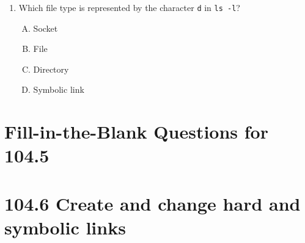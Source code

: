 \documentclass[a4paper]{report}
\begin{document}
\begin{enumerate}[1.]
    \item Which file type is represented by the character \texttt{d} in \texttt{ls -l}?  
    \begin{enumerate}[A)]
        \item Socket  
        \item File  
        \item Directory  
        \item Symbolic link  
    \end{enumerate}

\end{enumerate}
\newpage
\section*{Fill-in-the-Blank Questions for 104.5}

\newpage
\section*{104.6 Create and change hard and symbolic links}

\newpage
\end{document}
